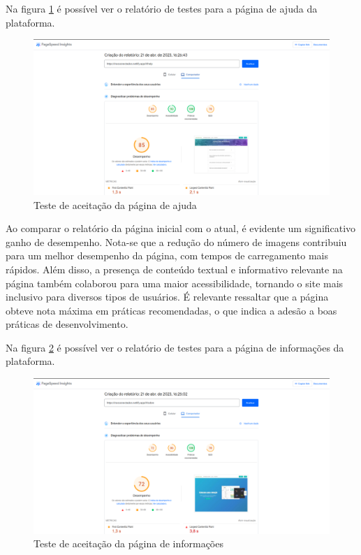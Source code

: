 \documentclass[tcc,capa]{texufpel}
\begin{document}
Na figura \ref{teste-ajuda} é possível ver o relatório de testes para a página de ajuda da plataforma.
\begin{figure}[htbp]
  \centering \includegraphics[scale=.25]{assets/desempenho-ajuda.png}
  \caption{Teste de aceitação da página de ajuda}
  \label{teste-ajuda}
\end{figure}

Ao comparar o relatório da página inicial com o atual, é evidente um significativo ganho de desempenho. Nota-se que a redução do número de imagens contribuiu para um melhor desempenho da página, com tempos de carregamento mais rápidos. Além disso, a presença de conteúdo textual e informativo relevante na página também colaborou para uma maior acessibilidade, tornando o site mais inclusivo para diversos tipos de usuários. É relevante ressaltar que a página obteve nota máxima em práticas recomendadas, o que indica a adesão a boas práticas de desenvolvimento.

Na figura \ref{teste-sobre} é possível ver o relatório de testes para a página de informações da plataforma.

\begin{figure}[htbp]
  \centering \includegraphics[scale=.25]{assets/desempenho-sobre.png}
  \caption{Teste de aceitação da página de informações}
  \label{teste-sobre}
\end{figure}
\end{document}
